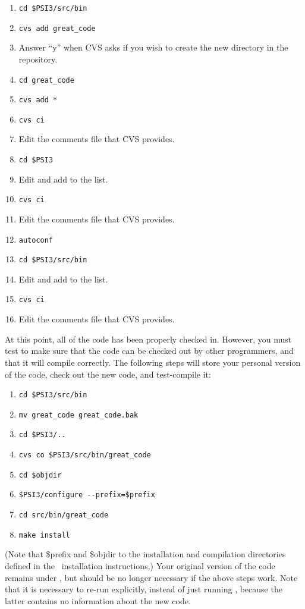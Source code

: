 \begin{enumerate}
\item {\tt cd \$PSI3/src/bin}
\item {\tt cvs add great\_code}
\item Answer ``y'' when CVS asks if you wish to create the new directory in
      the repository. 
\item {\tt cd great\_code}
\item {\tt cvs add *}
\item {\tt cvs ci}
\item Edit the comments file that CVS provides. 
\item {\tt cd \$PSI3}
\item Edit  and add  to the list. 
\item {\tt cvs ci}
\item Edit the comments file that CVS provides. 
\item {\tt autoconf} 
\item {\tt cd \$PSI3/src/bin} 
\item Edit  and add  to the list. 
\item {\tt cvs ci}
\item Edit the comments file that CVS provides. 
\end{enumerate}
At this point, all of the code has been properly checked in. However, you must
test to make sure that the code can be checked out by other programmers, and
that it will compile correctly. The following steps 
will store your personal version of the code, check out the new code, and
test-compile it:
\begin{enumerate}
\item {\tt cd \$PSI3/src/bin}
\item {\tt mv great\_code great\_code.bak}
\item {\tt cd \$PSI3/..}
\item {\tt cvs co \$PSI3/src/bin/great\_code}
\item {\tt cd \$objdir}
\item {\tt \$PSI3/configure -}{\tt -prefix=\$prefix}
\item {\tt cd src/bin/great\_code}
\item {\tt make install}
\end{enumerate}
(Note that \$prefix and \$objdir to the installation and compilation
 directories defined in the \PSIthree\ installation instructions.)
Your original version of the code remains under ,
but should be no longer necessary if the above steps work. Note that it is
necessary to re-run  explicitly, instead of just running
, because the latter contains no information about
the new code.

